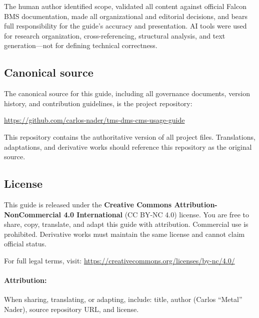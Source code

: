 \documentclass[11pt, a4paper, twoside]{report}
\begin{document}
The human author identified scope, validated all content against official Falcon BMS documentation, made all organizational and editorial decisions, and bears full responsibility for the guide's accuracy and presentation. AI tools were used for research organization, cross-referencing, structural analysis, and text generation---not for defining technical correctness.

\subsection{Canonical source}
\label{sec:C1-S4-S3}

The canonical source for this guide, including all governance documents, version history, and contribution guidelines, is the project repository:

\begin{center}
	\url{https://github.com/carlos-nader/tms-dms-cms-usage-guide}
\end{center}

This repository contains the authoritative version of all project files. Translations, adaptations, and derivative works should reference this repository as the original source.

\subsection{License}
\label{sec:C1-S4-S4}

This guide is released under the \textbf{Creative Commons Attribution-NonCommercial 4.0 International} (CC BY-NC 4.0) license. You are free to share, copy, translate, and adapt this guide with attribution. Commercial use is prohibited. Derivative works must maintain the same license and cannot claim official status.

For full legal terms, visit: \url{https://creativecommons.org/licenses/by-nc/4.0/}

\paragraph{Attribution:}
When sharing, translating, or adapting, include: title, author (Carlos ``Metal'' Nader), source repository URL, and license.
\end{document}
